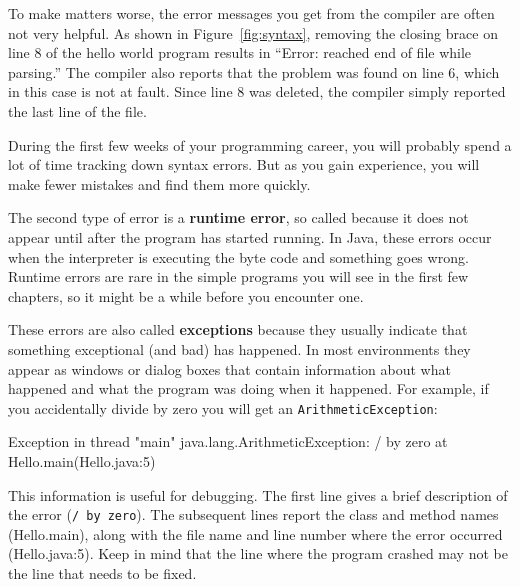 \documentclass[12pt]{book}
\makeatletter
\theoremstyle{exercise}
\newcommand{\java}[1]{\verb"#1"}
\renewcommand\subsection{\@startsection{subsection}{2}{\z@}%
    {-3.25ex\@plus -1ex \@minus -.2ex}%
    {0.3ex \@plus .2ex}%
    {\normalfont\large\bfseries}}
\newcommand{\java}[1]{\lstinline{#1}} %
\makeatother
\begin{document}
To make matters worse, the error messages you get from the compiler are often not very helpful.
As shown in Figure~\ref{fig:syntax}, removing the closing brace on line 8 of the hello world program results in ``Error: reached end of file while parsing.''
The compiler also reports that the problem was found on line 6, which in this case is not at fault.
Since line 8 was deleted, the compiler simply reported the last line of the file.

During the first few weeks of your programming career, you will probably spend a lot of time tracking down syntax errors.
But as you gain experience, you will make fewer mistakes and find them more quickly.



The second type of error is a {\bf runtime error}, so called because it does not appear until after the program has started running.
In Java, these errors occur when the interpreter is executing the byte code and something goes wrong.
Runtime errors are rare in the simple programs you will see in the first few chapters, so it might be a while before you encounter one.


These errors are also called {\bf exceptions} because they usually indicate that something exceptional (and bad) has happened.
In most environments they appear as windows or dialog boxes that contain information about what happened and what the program was doing when it happened.
For example, if you accidentally divide by zero you will get an \java{ArithmeticException}:

\begin{small}
\begin{stdout}
Exception in thread "main" java.lang.ArithmeticException: / by zero
    at Hello.main(Hello.java:5)
\end{stdout}
\end{small}

This information is useful for debugging.
The first line gives a brief description of the error (\java{/ by zero}).
The subsequent lines report the class and method names (Hello.main), along with the file name and line number where the error occurred (Hello.java:5).
Keep in mind that the line where the program crashed may not be the line that needs to be fixed.
\end{document}
